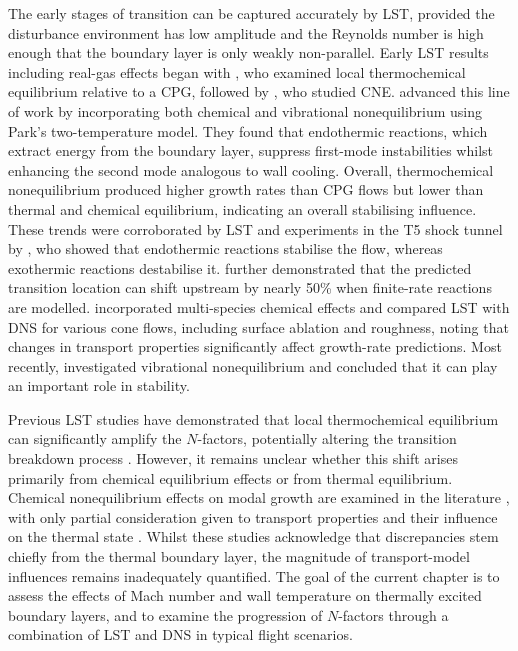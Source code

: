 The early stages of transition can be captured accurately by \gls{LST}, provided the disturbance environment has low amplitude and the Reynolds number is high enough that the boundary layer is only weakly non-parallel. Early \gls{LST} results including real-gas effects began with \cite{Malik1989, Malik1990a}, who examined local thermochemical equilibrium relative to a \gls{CPG}, followed by \cite{stuckertreed1994}, who studied \gls{CNE}. \cite{Hudson1997} advanced this line of work by incorporating both chemical and vibrational nonequilibrium using Park's two-temperature model. They found that endothermic reactions, which extract energy from the boundary layer, suppress first-mode instabilities whilst enhancing the second mode analogous to wall cooling. Overall, thermochemical nonequilibrium produced higher growth rates than \gls{CPG} flows but lower than thermal and chemical equilibrium, indicating an overall stabilising influence. These trends were corroborated by \gls{LST} and experiments in the T5 shock tunnel by \cite{JohnsonEtal1998}, who showed that endothermic reactions stabilise the flow, whereas exothermic reactions destabilise it. \cite{JohnsonCandler2005} further demonstrated that the predicted transition location can shift upstream by nearly 50\% when finite-rate reactions are modelled. \cite{MortensenZhong2013} incorporated multi-species chemical effects and compared \gls{LST} with \gls{DNS} for various cone flows, including surface ablation and roughness, noting that changes in transport properties significantly affect growth-rate predictions. Most recently, \cite{BitterShepherd2015} investigated vibrational nonequilibrium and concluded that it can play an important role in stability.

Previous \gls{LST} studies have demonstrated that local thermochemical equilibrium can significantly amplify the $N$-factors, potentially altering the transition breakdown process \citep{MiroMiro2019}. However, it remains unclear whether this shift arises primarily from chemical equilibrium effects or from thermal equilibrium. Chemical nonequilibrium effects on modal growth are examined in the literature \citep{FrankoMacCormackLele2010}, with only partial consideration given to transport properties and their influence on the thermal state \citep{LyttleReed2005}. Whilst these studies acknowledge that discrepancies stem chiefly from the thermal boundary layer, the magnitude of transport-model influences remains inadequately quantified. The goal of the current chapter is to assess the effects of Mach number and wall temperature on thermally excited boundary layers, and to examine the progression of $N$-factors through a combination of \gls{LST} and \gls{DNS} in typical flight scenarios.

